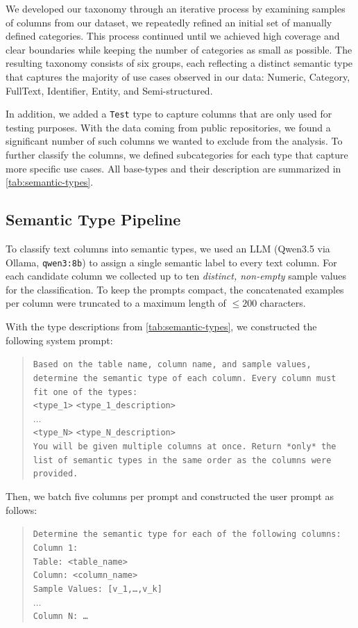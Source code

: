 We developed our taxonomy through an iterative process by examining samples of columns from our dataset, we repeatedly refined an initial set of manually defined categories.
This process continued until we achieved high coverage and clear boundaries while keeping the number of categories
as small as possible.
The resulting taxonomy consists of six groups, each reflecting a distinct semantic type that captures the
majority of use cases observed in our data: Numeric, Category, FullText, Identifier, Entity, and Semi-structured.

In addition, we added a \texttt{Test} type to capture columns that are only used for testing purposes.
With the data coming from public repositories, we found a significant number of such columns we wanted to exclude from the analysis.
To further classify the columns, we defined subcategories for each type that capture more specific use cases.
All base-types and their description are summarized in \cref{tab:semantic-types}.

\subsection{Semantic Type Pipeline}\label{sec:semantic-type-pipeline}
To classify text columns into semantic types, we used an \ac{LLM} (Qwen3.5 via Ollama, \texttt{qwen3:8b}) to assign a single semantic label to every text column.
For each candidate column we collected up to ten \emph{distinct, non-empty} sample values for the classification.
To keep the prompts compact, the concatenated examples per column were truncated to a maximum length of \(\leq 200\) characters.

With the type descriptions from \cref{tab:semantic-types}, we constructed the following system prompt:
\begin{quote}
    \small
    \texttt{Based on the table name, column name, and sample values, determine the semantic type of each column.
    Every column must fit one of the types:}\\
    \texttt{<type\_1>} \texttt{<type\_1\_description>}\\
    \(\dots\)\\
    \texttt{<type\_N>} \texttt{<type\_N\_description>}\\
    \texttt{You will be given multiple columns at once.
    Return *only* the list of semantic types in the same order as the columns were provided.}
\end{quote}
Then, we batch five columns per prompt and constructed the user prompt as follows:
\begin{quote}
    \small
    \texttt{Determine the semantic type for each of the following columns:}\\
    \texttt{Column 1:}\\
    \texttt{Table: <table\_name>}\\
    \texttt{Column: <column\_name>}\\
    \texttt{Sample Values: [v\_1,\dots,v\_k]}\\
    \(\dots\)\\
    \texttt{Column N: \dots}
\end{quote}

